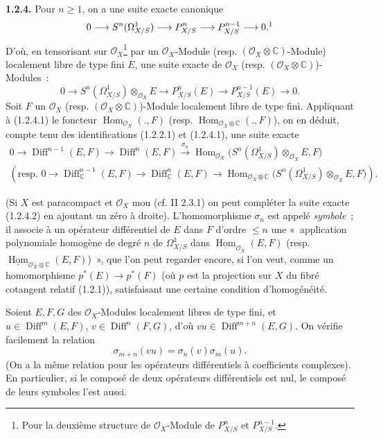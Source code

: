 \documentclass[11pt]{article}
\providecommand{\cO}{\mathcal O}\providecommand{\R}{\mathbb R}\providecommand{\N}{\mathbb N}
\providecommand{\Diff}{\operatorname{Diff}}\providecommand{\Homop}{\operatorname{Hom}}
\begin{document}
\textbf{1.2.4.} Pour $n\ge1$, on a une suite exacte canonique
\[
  0\longrightarrow S^n(\Omega^1_{X/S})
  \longrightarrow P^n_{X/S}
  \longrightarrow P^{n-1}_{X/S}
  \longrightarrow 0.\text{\footnotemark}
\]
%
D'où, en tensorisant sur $\cO_X$\footnote{Pour la deuxième structure de $\cO_X$-Module de $P^n_{X/S}$ et $P^{n-1}_{X/S}$.} par un $\cO_X$-Module (resp. $(\cO_X\otimes\mathbb C)$-Module) localement libre de type fini $E$, une suite exacte de $\cO_X$ (resp. $(\cO_X\otimes\mathbb C)$)-Modules~:
\begin{equation}\tag{1.2.4.1}
  0\longrightarrow S^n(\Omega^1_{X/S})\otimes_{\cO_X}E
  \longrightarrow P^n_{X/S}(E)
  \longrightarrow P^{n-1}_{X/S}(E)
  \longrightarrow 0.
\end{equation}
Soit $F$ un $\cO_X$ (resp. $(\cO_X\otimes\mathbb C)$)-Module localement libre de type fini. Appliquant à (1.2.4.1) le foncteur $\Homop_{\cO_X}(.,F)$ (resp. $\Homop_{\cO_X\otimes\mathbb C}(.,F)$), on en déduit, compte tenu des identifications (1.2.2.1) et (1.2.4.1), une suite exacte
\begin{equation}\tag{1.2.4.2}
\begin{gathered}
  0\longrightarrow \Diff^{n-1}(E,F)
  \longrightarrow \Diff^n(E,F)
  \xrightarrow{\sigma_n}
  \Homop_{\cO_X}\bigl(S^n(\Omega^1_{X/S})\otimes_{\cO_X}E,F\bigr)\\
  (\text{resp. } 0\longrightarrow \Diff^{n-1}_\mathbb C(E,F)
  \longrightarrow \Diff^n_\mathbb C(E,F)
  \longrightarrow
  \Homop_{\cO_X\otimes\mathbb C}\bigl(S^n(\Omega^1_{X/S})\otimes_{\cO_X}E,F\bigr)).
\end{gathered}
\end{equation}

(Si $X$ est
paracompact et $\cO_X$ mou (cf. II 2.3.1) on peut compléter la suite exacte (1.2.4.2) en ajoutant un zéro à droite). L'homomorphisme $\sigma_n$ est appelé \emph{symbole}~; il associe à un opérateur différentiel de $E$ dans $F$ d'ordre $\le n$ une «~application polynomiale homogène de degré $n$ de $\Omega^1_{X/S}$ dans $\underline{\Homop}_{\cO_X}(E,F)$ (resp. $\underline{\Homop}_{\cO_X\otimes\mathbb C}(E,F)$)~», que l'on peut regarder encore, si l'on veut, comme un homomorphisme $p^*(E)\longrightarrow p^*(F)$ (où $p$ est la projection sur $X$ du fibré cotangent relatif (1.2.1)), satisfaisant une certaine condition d'homogénéité.

Soient $E,F,G$ des $\cO_X$-Modules localement libres de type fini, et $u\in\Diff^m(E,F)$, $v\in\Diff^n(F,G)$, d'où $vu\in\Diff^{m+n}(E,G)$. On vérifie facilement la relation
\begin{equation}\tag{1.2.4.3}
  \sigma_{m+n}(vu)=\sigma_n(v)\sigma_m(u).
\end{equation}
(On a la même relation pour les opérateurs différentiels à coefficients complexes). En particulier, si le composé de deux opérateurs différentiels est nul, le composé de leurs symboles l'est aussi.
\end{document}
